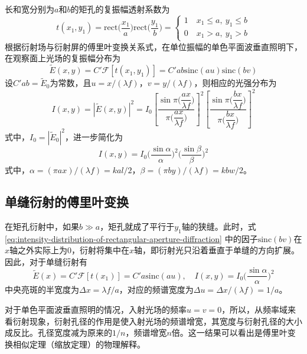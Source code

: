 \documentclass[cn,10pt,chinesefont=founder,math=mtpro2,cite=super,toc=onecol,twoside,openany]{elegantbook}
\begin{document}
长和宽分别为$a$和$b$的矩孔的复振幅透射系数为
\begin{equation}
t(x_1,y_1)=\mathrm{rect}\bigg(\frac{x_1}{a}\bigg)\mathrm{rect}\bigg(\frac{y_1}{b}\bigg)=
\begin{cases}
1\quad x_1\leqslant a,\ y_1\leqslant b\\
0\quad x_1>a,\ y_1>b
\end{cases}
\end{equation}
根据衍射场与衍射屏的傅里叶变换关系式，在单位振幅的单色平面波垂直照明下，在观察面上光场的复振幅分布为
\begin{equation}
\tilde{E}(x,y)=C'\mathscr{F}[t(x_1,y_1)]=C'ab\mathrm{sinc}(au)\mathrm{sinc}(bv)
\end{equation}
设$C'ab=\tilde{E}_0$为常数，且$u=x/(\lambda f)$，$v=y/(\lambda f)$，则相应的光强分布为
\begin{equation}
I(x,y)=|\tilde{E}(x,y)|^2=I_0\left[\frac{\sin\pi\bigg(\dfrac{ax}{\lambda f}\bigg)}{\pi\bigg(\dfrac{ax}{\lambda f}\bigg)}\right]^2\left[\frac{\sin\pi\bigg(\dfrac{bx}{\lambda f}\bigg)}{\pi\bigg(\dfrac{bx}{\lambda f}\bigg)}\right]^2
\end{equation}
式中，$I_0=|\tilde{E}_0|^2$，进一步简化为
\begin{equation}
I(x,y)=I_0\bigg(\frac{\sin\alpha}{\alpha}\bigg)^2\bigg(\frac{\sin\beta}{\beta}\bigg)^2
\label{eq:intensity-distribution-of-rectangular-aperture-diffraction}
\end{equation}
式中，$\alpha=(\pi ax)/(\lambda f)=kal/2$，$\beta=(\pi by)/(\lambda f)=kbw/2$。

\subsection{单缝衍射的傅里叶变换}
在矩孔衍射中，如果$b\gg a$，矩孔就成了平行于$y_1$轴的狭缝。此时，式 \eqref{eq:intensity-distribution-of-rectangular-aperture-diffraction} 中的因子$\mathrm{sinc}(bv)$在$x$轴之外实际上为$0$，衍射将集中在$x$轴，即衍射光只沿着垂直于单缝的方向扩展。因此，对于单缝衍射有
\begin{equation}
\tilde{E}(x)=C'\mathscr{F}[t(x_1)]=C'a\mathrm{sinc}(au),\quad I(x,y)=I_0\bigg(\frac{\sin\alpha}{\alpha}\bigg)^2
\end{equation}
中央亮斑的半宽度为$\Delta x=\lambda f/a$，对应的频谱宽度为$\Delta u=\Delta x/(\lambda f)=1/a$。

对于单色平面波垂直照明的情况，入射光场的频率$u=v=0$，所以，从频率域来看衍射现象，衍射孔径的作用是使入射光场的频谱增宽，其宽度与衍射孔径的大小成反比。孔径宽度减为原来的$1/n$，频谱增宽$n$倍。这一结果可以看出是傅里叶变换相似定理（缩放定理）的物理解释。
\end{document}
